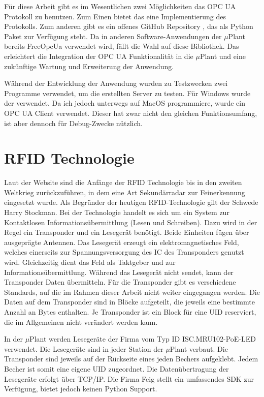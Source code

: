 Für diese Arbeit gibt es im Wesentlichen zwei Möglichkeiten das OPC UA Protokoll zu benutzen. 
Zum Einen bietet das \cite[Qt Framework]{QtOPCUA} eine Implementierung des Protokolls. 
Zum anderen gibt es ein offenes GitHub Repository \cite[FreeOpcUa]{asyncua}, das als Python Paket zur Verfügung steht. 
Da in anderen Software-Anwendungen der $\mu$Plant bereits FreeOpcUa verwendet wird, fällt die Wahl auf diese Bibliothek.
Das erleichtert die Integration der OPC UA Funktionalität in die $\mu$Plant und eine zukünftige Wartung und Erweiterung der Anwendung.

Während der Entwicklung der Anwendung wurden zu Testzwecken zwei Programme verwendet, um die erstellten Server zu testen. 
Für Windows wurde der \cite[OPC UA Client UaExpert]{UaExpert}verwendet. Da ich jedoch unterwegs auf MacOS programmiere, wurde 
ein OPC UA Client \cite[OPC UA Client für Mac]{uaClientMac} verwendet. 
Dieser hat zwar nicht den gleichen Funktionsumfang, ist aber dennoch für Debug-Zwecke nützlich. 

\section{RFID Technologie}

Laut der Website \cite[RFID Grundlagen]{RFIDGrundlagen} sind die Anfänge der RFID Technologie bis in den zweiten Weltkrieg zurückzuführen, 
in dem eine Art Sekundärradar zur Feinerkennung eingesetzt wurde. Als Begründer der heutigen RFID-Technologie gilt der Schwede Harry Stockman. 
Bei der Technologie handelt es sich um ein System zur Kontaktlosen Informationsübermittlung (Lesen und Schreiben). 
Dazu wird in der Regel ein Transponder und ein Lesegerät benötigt. Beide Einheiten fügen über ausgeprägte Antennen.
Das Lesegerät erzeugt ein elektromagnetisches Feld, welches einerseits zur Spannungsversorgung des IC des Transponders genutzt wird.
Gleichzeitig dient das Feld als Taktgeber und zur Informationsübermittlung. 
Während das Lesegerät nicht sendet, kann der Transponder Daten übermitteln. 
Für die Transponder gibt es verschiedene Standards, auf die im Rahmen dieser Arbeit nicht weiter eingegangen werden. 
Die Daten auf dem Transponder sind in Blöcke aufgeteilt, die jeweils eine bestimmte Anzahl an Bytes enthalten.
Je Transponder ist ein Block für eine UID reserviert, die im Allgemeinen nicht verändert werden kann.

In der $\mu$Plant werden Lesegeräte der Firma \cite[FEIG GmbH]{RFIDFeig} vom Typ ID ISC.MRU102-PoE-LED verwendet. 
Die Lesegeräte sind in jeder Station der $\mu$Plant verbaut.
Die Transponder sind jeweils auf der Rückseite eines jeden Bechers aufgeklebt. 
Jedem Becher ist somit eine eigene UID zugeordnet. Die Datenübertragung der Lesegeräte erfolgt über TCP/IP.
Die Firma Feig stellt ein umfassendes SDK zur Verfügung, bietet jedoch keinen Python Support.


